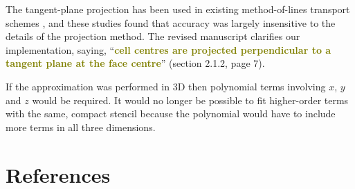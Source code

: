 \documentclass[times]{elsarticle}
\newcommand{\revthree}[1]{\textcolor{olive}{\textbf{#1}}}
\begin{document}
\begin{quotation}
\begin{comment}
Can you comment on the projection to the tangent plane for the spherical test example. 
Note that projection to another grid can change the interpolation/approximation essentially, 
like the transformation of a boundary following grid in physical space to a Cartesian grid in 
computational space. Why is the interpolation/approximation not done in 3 dimensional 
physical space.
\end{comment}
\end{quotation}
The tangent-plane projection has been used in existing method-of-lines transport schemes \citep{lashley2002,skamarock-menchaca2010,skamarock-gassmann2011}, and these studies found that accuracy was largely insensitive to the details of the projection method.  The revised manuscript clarifies our implementation, saying, ``\revthree{cell centres are projected perpendicular to a tangent plane at the face centre}'' (section 2.1.2, page 7).

If the approximation was performed in 3D then polynomial terms involving $x$, $y$ and $z$ would be required.  It would no longer be possible to fit higher-order terms with the same, compact stencil because the polynomial would have to include more terms in all three dimensions.

\section*{References}


\end{document}
